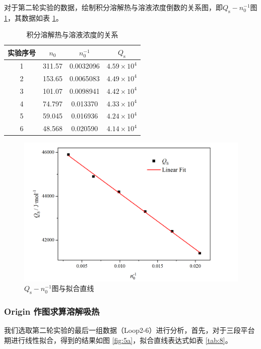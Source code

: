 \documentclass[cn,hazy,pku,12pt,normal,math=newtx,cite=super]{elegantnote}
\begin{document}
对于第二轮实验的数据，绘制积分溶解热与溶液浓度倒数的关系图，即$Q_{\mathrm{s}}-n_0^{-1}$图 \ref{fig:5}，其数据如表 \ref{tab:7}。

\begin{table}[htbp]
    \centering
    \caption{积分溶解热与溶液浓度的关系}
    \begin{tabular}{cccc}
        \toprule
        实验序号 & $n_0$ & $n_0^{-1}$ & $Q_{\mathrm{s}}$ \\
        \midrule
        1 & 311.57 & 0.0032096 & $4.59\times 10^{4}$ \\
        2 & 153.65 & 0.0065083 & $4.49\times 10^{4}$ \\
        3 & 101.07 & 0.0098941 & $4.42\times 10^{4}$ \\
        4 & 74.797 & 0.013370 & $4.33\times 10^{4}$ \\
        5 & 59.045 & 0.016936 & $4.24\times 10^{4}$ \\
        6 & 48.568 & 0.020590 & $4.14\times 10^{4}$ \\
        \bottomrule
    \end{tabular}
    \label{tab:7}
\end{table}

\begin{figure}[htbp]
    \centering
    \includegraphics[width=.75\textwidth]{figures/4-1.png}
    \caption{$Q_{\mathrm{s}}-n_0^{-1}$图与拟合直线}
    \label{fig:5}
\end{figure}

\subsubsection{Origin 作图求算溶解吸热}

我们选取第二轮实验的最后一组数据（Loop2-6）进行分析，首先，对于三段平台期进行线性拟合，得到的结果如图 \ref{fig:5a}，拟合直线表达式如表 \ref{tab:8}。
\end{document}
